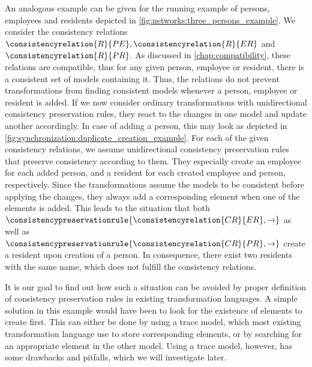 An analogous example can be given for the running example of persons, employees and residents depicted in \autoref{fig:networks:three_persons_example}.
We consider the consistency relations $\consistencyrelation{R}{PE}, \consistencyrelation{R}{ER}$ and $\consistencyrelation{R}{PR}$.
As discussed in \autoref{chap:compatibility}, these relations are compatible, thus for any given person, employee or resident, there is a consistent set of models containing it.
Thus, the relations do not prevent transformations from finding consistent models whenever a person, employee or resident is added.
If we now consider ordinary transformations with unidirectional consistency preservation rules, they react to the changes in one model and update another accordingly.
In case of adding a person, this may look as depicted in \autoref{fig:synchronization:duplicate_creation_example}.
For each of the given consistency relations, we assume unidirectional consistency preservation rules that preserve consistency according to them.
They especially create an employee for each added person, and a resident for each created employee and person, respectively.
Since the transformations assume the models to be consistent before applying the changes, they always add a corresponding element when one of the elements is added.
This leads to the situation that both $\consistencypreservationrule{\consistencyrelation{CR}{ER},\rightarrow}$ as well as $\consistencypreservationrule{\consistencyrelation{CR}{PR},\rightarrow}$ create a resident upon creation of a person.
In consequence, there exist two residents with the same name, which does not fulfill the consistency relations.

It is our goal to find out how such a situation can be avoided by proper definition of consistency preservation rules in existing transformation languages.
A simple solution in this example would have been to look for the existence of elements to create first.
This can either be done by using a trace model, which most existing transformation language use to store corresponding elements, or by searching for an appropriate element in the other model.
Using a trace model, however, has some drawbacks and pitfalls, which we will investigate later.




